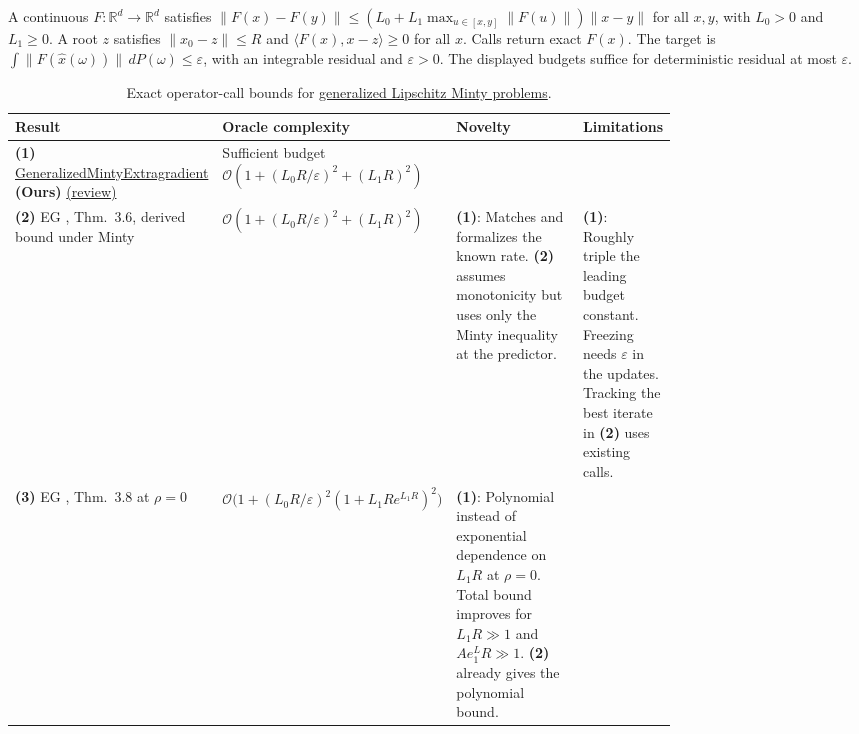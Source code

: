 \begin{table}[tp]
\centering
\caption{Exact operator-call bounds for \href{https://github.com/k3nfalt/longtails/blob/main/LongTails/Setups/GeneralizedLipschitzMinty.lean}{generalized Lipschitz Minty problems}.}\label{tab:GeneralizedLipschitzMinty}
\parbox{\linewidth}{\footnotesize A continuous \(F:\mathbb R^d\to\mathbb R^d\) satisfies
\(\|F(x)-F(y)\|\le (L_0+L_1\max_{u\in[x,y]}\|F(u)\|)\|x-y\|\) for all \(x,y\), with \(L_0>0\) and \(L_1\ge0\). A root \(z\) satisfies \(\|x_0-z\|\le R\) and \(\langle F(x),x-z\rangle\ge0\) for all \(x\). Calls return exact \(F(x)\). The target is \(\int\|F(\widehat x(\omega))\|\,dP(\omega)\le\varepsilon\), with an integrable residual and \(\varepsilon>0\). The displayed budgets suffice for deterministic residual at most \(\varepsilon\).}\par\smallskip
\begin{threeparttable}
\footnotesize
\setlength{\tabcolsep}{4pt}\renewcommand{\arraystretch}{1.25}
\begin{tabularx}{\linewidth}{@{}>{\raggedright\arraybackslash}p{0.23\linewidth}>{\raggedright\arraybackslash}p{0.27\linewidth}>{\raggedright\arraybackslash}p{0.27\linewidth}>{\raggedright\arraybackslash}X@{}}
\toprule
\textbf{Result} & \textbf{Oracle complexity} & \textbf{Novelty} & \textbf{Limitations} \\
\midrule
\textbf{(1)} \href{https://github.com/k3nfalt/longtails/blob/main/LongTails/Theorems/GeneralizedMintyExtragradient.lean}{Generalized\allowbreak{}Minty\allowbreak{}Extra\allowbreak{}gradient} \textbf{(Ours)} \href{https://github.com/k3nfalt/longtails/blob/main/scripts/reviews/GeneralizedMintyExtragradient.md}{(review)}
& Sufficient budget \(\mathcal{O}(1+(L_0R/\varepsilon)^2+(L_1R)^2)\)
& & \\
\midrule[1.2pt]
\textbf{(2)} EG \citep{glmChoudhuryLoizou2025Minty}, Thm.~3.6, derived bound under Minty
& \(\mathcal{O}(1+(L_0R/\varepsilon)^2+(L_1R)^2)\)
& \textbf{(1)}: Matches and formalizes the known rate. \textbf{(2)} assumes monotonicity but uses only the Minty inequality at the predictor.
& \textbf{(1)}: Roughly triple the leading budget constant. Freezing needs \(\varepsilon\) in the updates. Tracking the best iterate in \textbf{(2)} uses existing calls. \\
\midrule
\textbf{(3)} EG \citep{glmChoudhuryLoizou2025Minty}, Thm.~3.8 at \(\rho=0\)
& \(\mathcal{O}\bigl(1+(L_0R/\varepsilon)^2(1+L_1R e^{L_1R})^2\bigr)\)
& \textbf{(1)}: Polynomial instead of exponential dependence on \(L_1R\) at \(\rho=0\). Total bound improves for \(L_1R\gg1\) and \(Ae^L_1R\gg1\). \textbf{(2)} already gives the polynomial bound.

\end{tabularx}
\end{threeparttable}
\end{table}
